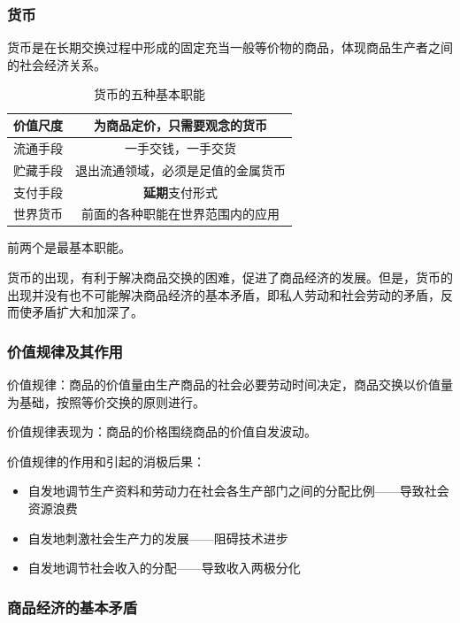 \documentclass[12pt, a4paper, oneside]{ctexart}
\begin{document}
\subsubsection{货币}

货币是在长期交换过程中形成的固定充当一般等价物的商品，体现商品生产者之间的社会经济关系。

\begin{table}[h]
  \centering
  \caption{货币的五种基本职能}
  \begin{tabular}{|c|c|}
    \hline
    价值尺度 & 为商品定价，只需要观念的货币 \\ \hline
    流通手段 & 一手交钱，一手交货 \\ \hline
    贮藏手段 & 退出流通领域，必须是足值的金属货币 \\ \hline
    支付手段 & \textbf{延期}支付形式 \\ \hline
    世界货币 & 前面的各种职能在世界范围内的应用 \\
    \hline
  \end{tabular}
\end{table}

前两个是最基本职能。

货币的出现，有利于解决商品交换的困难，促进了商品经济的发展。但是，货币的出现并没有也不可能解决商品经济的基本矛盾，即私人劳动和社会劳动的矛盾，反而使矛盾扩大和加深了。

\subsubsection{价值规律及其作用}

价值规律：商品的价值量由生产商品的社会必要劳动时间决定，商品交换以价值量为基础，按照等价交换的原则进行。

价值规律表现为：商品的价格围绕商品的价值自发波动。

价值规律的作用和引起的消极后果：
\begin{itemize}
  \item 自发地调节生产资料和劳动力在社会各生产部门之间的分配比例——导致社会资源浪费
  \item 自发地刺激社会生产力的发展——阻碍技术进步
  \item 自发地调节社会收入的分配——导致收入两极分化
\end{itemize}

\subsubsection{商品经济的基本矛盾}
\end{document}
